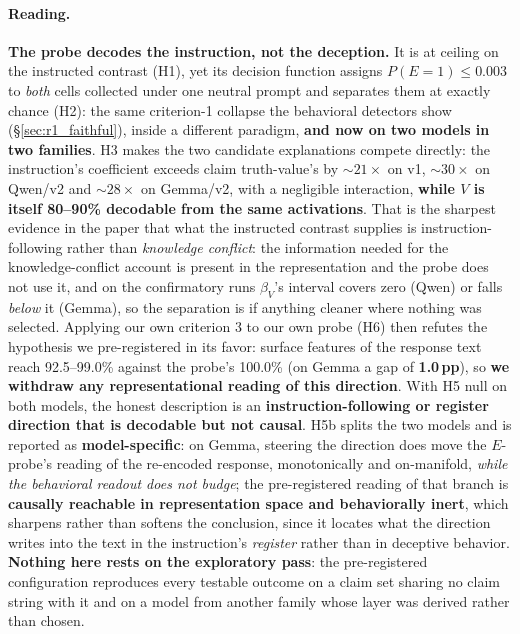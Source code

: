 \paragraph{Reading.} \textbf{The probe decodes the instruction, not the deception.} It is at ceiling on the instructed contrast (H1), yet its decision function assigns $P(E\!=\!1)\!\leq\!0.003$ to \emph{both} cells collected under one neutral prompt and separates them at exactly chance (H2): the same criterion-1 collapse the behavioral detectors show (§\ref{sec:r1_faithful}), inside a different paradigm, \textbf{and now on two models in two families}. H3 makes the two candidate explanations compete directly: the instruction's coefficient exceeds claim truth-value's by ${\sim}21\times$ on v1, ${\sim}30\times$ on Qwen/v2 and ${\sim}28\times$ on Gemma/v2, with a negligible interaction, \textbf{while $V$ is itself 80--90\% decodable from the same activations}. That is the sharpest evidence in the paper that what the instructed contrast supplies is instruction-following rather than \emph{knowledge conflict}: the information needed for the knowledge-conflict account is present in the representation and the probe does not use it, and on the confirmatory runs $\beta_V$'s interval covers zero (Qwen) or falls \emph{below} it (Gemma), so the separation is if anything cleaner where nothing was selected. Applying our own criterion 3 to our own probe (H6) then refutes the hypothesis we pre-registered in its favor: surface features of the response text reach 92.5--99.0\% against the probe's 100.0\% (on Gemma a gap of \textbf{1.0\,pp}), so \textbf{we withdraw any representational reading of this direction}. With H5 null on both models, the honest description is an \textbf{instruction-following or register direction that is decodable but not causal}. H5b splits the two models and is reported as \textbf{model-specific}: on Gemma, steering the direction does move the $E$-probe's reading of the re-encoded response, monotonically and on-manifold, \emph{while the behavioral readout does not budge}; the pre-registered reading of that branch is \textbf{causally reachable in representation space and behaviorally inert}, which sharpens rather than softens the conclusion, since it locates what the direction writes into the text in the instruction's \emph{register} rather than in deceptive behavior. \textbf{Nothing here rests on the exploratory pass}: the pre-registered configuration reproduces every testable outcome on a claim set sharing no claim string with it and on a model from another family whose layer was derived rather than chosen.

